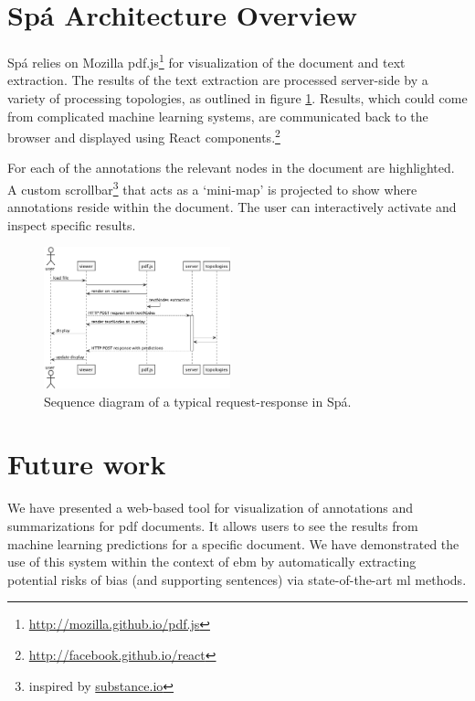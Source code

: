 \documentclass[runningheads,a4paper]{llncs}
\begin{document}
\section{Spá Architecture Overview}
Spá relies on Mozilla pdf.js\footnote{\url{http://mozilla.github.io/pdf.js}} for visualization of the document and text extraction.
The results of the text extraction are processed server-side by a variety of processing topologies, as outlined in figure \ref{fig:sequence}.
Results, which could come from complicated machine learning systems, are communicated back to the browser and displayed using React components.\footnote{\url{http://facebook.github.io/react}}

For each of the annotations the relevant nodes in the document are highlighted.
A custom scrollbar\footnote{inspired by \href{http://substance.io/}{substance.io}} that acts as a `mini-map' is projected to show where annotations reside within the document.
The user can interactively activate and inspect specific results.
\label{section:architecture}
\begin{figure}
  \begin{center}
    \includegraphics[width=0.48\textwidth]{./diagrams/sequence.pdf}
  \end{center}
  \caption{\label{fig:sequence}Sequence diagram of a typical request-response in Spá.}
\end{figure}

\section{Future work}
We have presented a web-based tool for visualization of annotations and summarizations for \ac{pdf} documents.
It allows users to see the results from machine learning predictions for a specific document.
We have demonstrated the use of this system within the context of \ac{ebm} by automatically extracting potential risks of bias (and supporting sentences) via state-of-the-art \ac{ml} methods.
\end{document}
